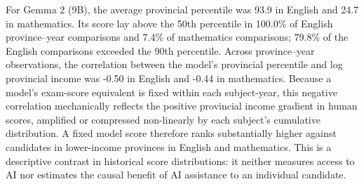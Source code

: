 For Gemma 2 (9B), the average provincial percentile was 93.9 in English and 24.7 in mathematics. Its score lay above the 50th percentile in 100.0\% of English province--year comparisons and 7.4\% of mathematics comparisons; 79.8\% of the English comparisons exceeded the 90th percentile. Across province--year observations, the correlation between the model's provincial percentile and log provincial income was -0.50 in English and -0.44 in mathematics. Because a model's exam-score equivalent is fixed within each subject-year, this negative correlation mechanically reflects the positive provincial income gradient in human scores, amplified or compressed non-linearly by each subject's cumulative distribution. A fixed model score therefore ranks substantially higher against candidates in lower-income provinces in English and mathematics. This is a descriptive contrast in historical score distributions: it neither measures access to AI nor estimates the causal benefit of AI assistance to an individual candidate.
